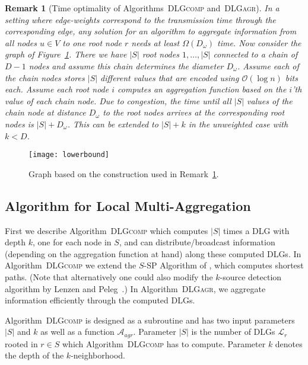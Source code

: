\documentclass[11pt]{article}
\newcommand{\BO}{\mathcal{O}}
\newtheorem{remark}[theorem]{Remark}
\newcommand{\calL}{\mathcal{L}}
\newif\iffull
\newif\ifshort
\begin{document}
\fi
\begin{remark}[Time optimality of Algorithms\iffull~\ref{alg:DLGcomp}\fi~\textsc{DLGcomp} and\iffull~\ref{alg:DLGagr}\fi~\textsc{DLGagr}]\label{rem:lowerbound}
In a setting where edge-weights correspond to the transmission time through the corresponding edge, any solution for an algorithm to aggregate information from all nodes $u\in V$ to one root node $r$ needs at least $\Omega(D_\omega)$ time. Now consider the graph of Figure~\ref{fig:lowerbound}. There we have $|S|$ root nodes $1,\dots,|S|$ connected to a chain of $D-1$ nodes and assume this chain determines the diameter $D_\omega$. Assume each of the chain nodes stores $|S|$ different values that are encoded using $\BO(\log n)$ bits each. Assume each root node $i$ computes an aggregation function based on the $i$'th value of each chain node. Due to congestion, the time until all $|S|$ values of the chain node at distance $D_\omega$ to the root nodes arrives at the corresponding root nodes is $|S|+D_\omega$. This can be extended to $|S|+k$ in the unweighted case with $k<D$.
\end{remark}
\begin{figure}[ht]
	\begin{center}
		\texttt{[image: lowerbound]}
	\end{center}
	\caption{Graph based on the construction used in Remark~\ref{rem:lowerbound}.}
	\label{fig:lowerbound}
\end{figure}

\subsection{Algorithm for Local Multi-Aggregation}\label{sec:aggregate}



First we describe Algorithm\iffull~\ref{alg:DLGcomp}\fi~\textsc{DLGcomp} which computes $|S|$ times a DLG with depth $k$, one for each node in $S$, and can distribute/broadcast information (depending on the aggregation function at hand) along these computed DLGs. In Algorithm\iffull~\ref{alg:DLGcomp}\fi~\textsc{DLGcomp} we extend the $S$-SP Algorithm of \cite{holzer2012optimal}, which computes shortest paths. (Note that alternatively one could also modify the $k$-source detection algorithm by Lenzen and Peleg~\cite{lenzen2013efficient}.) In Algorithm\iffull~\ref{alg:DLGagr}\fi~\textsc{DLGagr}, we aggregate information efficiently through the computed DLGs.
\ifshort
\footnote{In addition to the descriptions in the text below, the pseudocode of Algorithms \textsc{DLGcomp} and \textsc{DLGagr} are stated in Appendix \ref{FULL:sec:aggregate} (for the convenience of the reviewer).}
\fi
Algorithm\iffull~\ref{alg:DLGcomp}\fi~\textsc{DLGcomp} is designed as a subroutine and has two input parameters $|S|$ and $k$ as well as a function ${\mathcal{A}}_{agr}$.
Parameter $|S|$ is the number of DLGs $\calL_r$ rooted in $r\in S$ which Algorithm\iffull~\ref{alg:DLGcomp}\fi~\textsc{DLGcomp} has to compute.
Parameter $k$ denotes the depth of the $k$-neighborhood.
\end{document}
